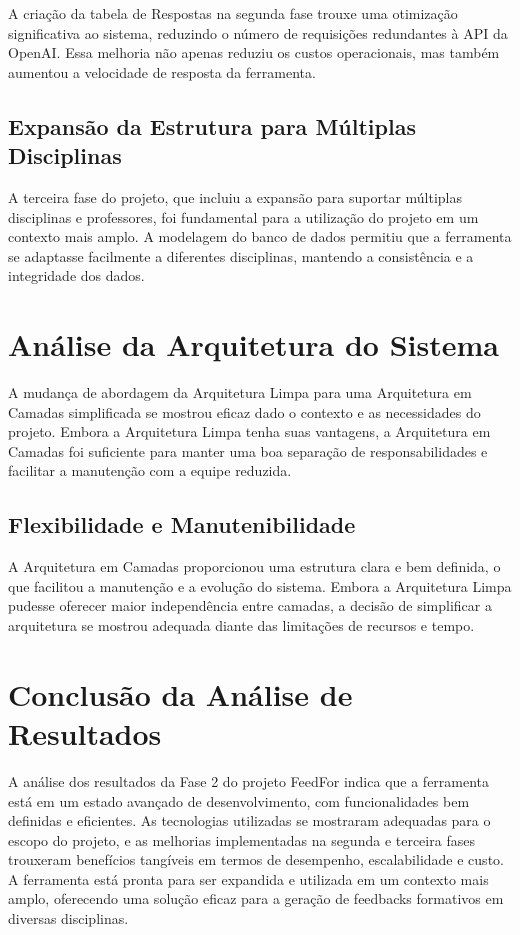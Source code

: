 A criação da tabela de Respostas na segunda fase trouxe uma otimização significativa ao sistema, reduzindo o número de requisições redundantes à API da OpenAI. Essa melhoria não apenas reduziu os custos operacionais, mas também aumentou a velocidade de resposta da ferramenta.

\subsection{Expansão da Estrutura para Múltiplas Disciplinas}

A terceira fase do projeto, que incluiu a expansão para suportar múltiplas disciplinas e professores, foi fundamental para a utilização do projeto em um contexto mais amplo. A modelagem do banco de dados permitiu que a ferramenta se adaptasse facilmente a diferentes disciplinas, mantendo a consistência e a integridade dos dados.

\section{Análise da Arquitetura do Sistema}

A mudança de abordagem da Arquitetura Limpa para uma Arquitetura em Camadas simplificada se mostrou eficaz dado o contexto e as necessidades do projeto. Embora a Arquitetura Limpa tenha suas vantagens, a Arquitetura em Camadas foi suficiente para manter uma boa separação de responsabilidades e facilitar a manutenção com a equipe reduzida.

\subsection{Flexibilidade e Manutenibilidade}

A Arquitetura em Camadas proporcionou uma estrutura clara e bem definida, o que facilitou a manutenção e a evolução do sistema. Embora a Arquitetura Limpa pudesse oferecer maior independência entre camadas, a decisão de simplificar a arquitetura se mostrou adequada diante das limitações de recursos e tempo.

\section{Conclusão da Análise de Resultados}

A análise dos resultados da Fase 2 do projeto FeedFor indica que a ferramenta está em um estado avançado de desenvolvimento, com funcionalidades bem definidas e eficientes. As tecnologias utilizadas se mostraram adequadas para o escopo do projeto, e as melhorias implementadas na segunda e terceira fases trouxeram benefícios tangíveis em termos de desempenho, escalabilidade e custo. A ferramenta está pronta para ser expandida e utilizada em um contexto mais amplo, oferecendo uma solução eficaz para a geração de feedbacks formativos em diversas disciplinas.
